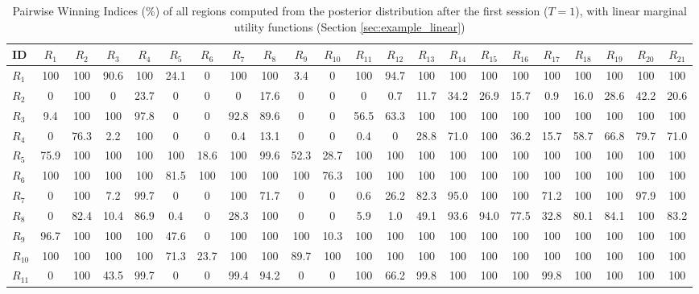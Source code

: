 \begin{table}[h!]
\centering
\footnotesize
\caption{Pairwise Winning Indices (\%) of all regions computed from the posterior distribution after the first session ($T=1$), with linear marginal utility functions (Section \ref{sec:example_linear})}
\label{tab:PWI_lin_t1}
\begin{tabularx}{\textwidth}{X|CCCCCCCCCCCCCCCCCCCCC}
\toprule
ID&$R_{1}$&$R_{2}$&$R_{3}$&$R_{4}$&$R_{5}$&$R_{6}$&$R_{7}$&$R_{8}$&$R_{9}$&$R_{10}$&$R_{11}$&$R_{12}$&$R_{13}$&$R_{14}$&$R_{15}$&$R_{16}$&$R_{17}$&$R_{18}$&$R_{19}$&$R_{20}$&$R_{21}$\\
\midrule
$R_{1}$ & 100 & 100 & 90.6 & 100 & 24.1 & 0 & 100 & 100 & 3.4 & 0 & 100 & 94.7 & 100 & 100 & 100 & 100 & 100 & 100 & 100 & 100 & 100 \\
$R_{2}$ & 0 & 100 & 0 & 23.7 & 0 & 0 & 0 & 17.6 & 0 & 0 & 0 & 0.7 & 11.7 & 34.2 & 26.9 & 15.7 & 0.9 & 16.0 & 28.6 & 42.2 & 20.6 \\
$R_{3}$ & 9.4 & 100 & 100 & 97.8 & 0 & 0 & 92.8 & 89.6 & 0 & 0 & 56.5 & 63.3 & 100 & 100 & 100 & 100 & 100 & 100 & 100 & 100 & 100 \\
$R_{4}$ & 0 & 76.3 & 2.2 & 100 & 0 & 0 & 0.4 & 13.1 & 0 & 0 & 0.4 & 0 & 28.8 & 71.0 & 100 & 36.2 & 15.7 & 58.7 & 66.8 & 79.7 & 71.0 \\
$R_{5}$ & 75.9 & 100 & 100 & 100 & 100 & 18.6 & 100 & 99.6 & 52.3 & 28.7 & 100 & 100 & 100 & 100 & 100 & 100 & 100 & 100 & 100 & 100 & 100 \\
$R_{6}$ & 100 & 100 & 100 & 100 & 81.5 & 100 & 100 & 100 & 100 & 76.3 & 100 & 100 & 100 & 100 & 100 & 100 & 100 & 100 & 100 & 100 & 100 \\
$R_{7}$ & 0 & 100 & 7.2 & 99.7 & 0 & 0 & 100 & 71.7 & 0 & 0 & 0.6 & 26.2 & 82.3 & 95.0 & 100 & 100 & 71.2 & 100 & 100 & 97.9 & 100 \\
$R_{8}$ & 0 & 82.4 & 10.4 & 86.9 & 0.4 & 0 & 28.3 & 100 & 0 & 0 & 5.9 & 1.0 & 49.1 & 93.6 & 94.0 & 77.5 & 32.8 & 80.1 & 84.1 & 100 & 83.2 \\
$R_{9}$ & 96.7 & 100 & 100 & 100 & 47.6 & 0 & 100 & 100 & 100 & 10.3 & 100 & 100 & 100 & 100 & 100 & 100 & 100 & 100 & 100 & 100 & 100 \\
$R_{10}$ & 100 & 100 & 100 & 100 & 71.3 & 23.7 & 100 & 100 & 89.7 & 100 & 100 & 100 & 100 & 100 & 100 & 100 & 100 & 100 & 100 & 100 & 100 \\
$R_{11}$ & 0 & 100 & 43.5 & 99.7 & 0 & 0 & 99.4 & 94.2 & 0 & 0 & 100 & 66.2 & 99.8 & 100 & 100 & 100 & 99.8 & 100 & 100 & 100 & 100 \\

\end{tabularx}
\end{table}
